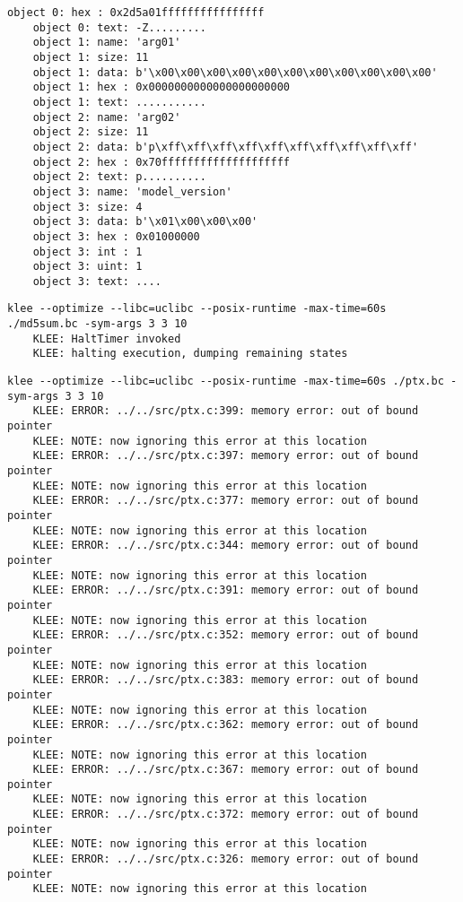 \documentclass[12pt,letterpaper]{article}
\begin{document}
\begin{mdframed}
\begin{lstlisting}[basicstyle=\tiny]
    object 0: hex : 0x2d5a01ffffffffffffffff
    object 0: text: -Z.........
    object 1: name: 'arg01'
    object 1: size: 11
    object 1: data: b'\x00\x00\x00\x00\x00\x00\x00\x00\x00\x00\x00'
    object 1: hex : 0x0000000000000000000000
    object 1: text: ...........
    object 2: name: 'arg02'
    object 2: size: 11
    object 2: data: b'p\xff\xff\xff\xff\xff\xff\xff\xff\xff\xff'
    object 2: hex : 0x70ffffffffffffffffffff
    object 2: text: p..........
    object 3: name: 'model_version'
    object 3: size: 4
    object 3: data: b'\x01\x00\x00\x00'
    object 3: hex : 0x01000000
    object 3: int : 1
    object 3: uint: 1
    object 3: text: ....
  \end{lstlisting}
  \begin{lstlisting}[basicstyle=\tiny]
    klee --optimize --libc=uclibc --posix-runtime -max-time=60s ./md5sum.bc -sym-args 3 3 10
    KLEE: HaltTimer invoked
    KLEE: halting execution, dumping remaining states
  \end{lstlisting}
  \begin{lstlisting}[basicstyle=\tiny]
    klee --optimize --libc=uclibc --posix-runtime -max-time=60s ./ptx.bc -sym-args 3 3 10
    KLEE: ERROR: ../../src/ptx.c:399: memory error: out of bound pointer
    KLEE: NOTE: now ignoring this error at this location
    KLEE: ERROR: ../../src/ptx.c:397: memory error: out of bound pointer
    KLEE: NOTE: now ignoring this error at this location
    KLEE: ERROR: ../../src/ptx.c:377: memory error: out of bound pointer
    KLEE: NOTE: now ignoring this error at this location
    KLEE: ERROR: ../../src/ptx.c:344: memory error: out of bound pointer
    KLEE: NOTE: now ignoring this error at this location
    KLEE: ERROR: ../../src/ptx.c:391: memory error: out of bound pointer
    KLEE: NOTE: now ignoring this error at this location
    KLEE: ERROR: ../../src/ptx.c:352: memory error: out of bound pointer
    KLEE: NOTE: now ignoring this error at this location
    KLEE: ERROR: ../../src/ptx.c:383: memory error: out of bound pointer
    KLEE: NOTE: now ignoring this error at this location
    KLEE: ERROR: ../../src/ptx.c:362: memory error: out of bound pointer
    KLEE: NOTE: now ignoring this error at this location
    KLEE: ERROR: ../../src/ptx.c:367: memory error: out of bound pointer
    KLEE: NOTE: now ignoring this error at this location
    KLEE: ERROR: ../../src/ptx.c:372: memory error: out of bound pointer
    KLEE: NOTE: now ignoring this error at this location
    KLEE: ERROR: ../../src/ptx.c:326: memory error: out of bound pointer
    KLEE: NOTE: now ignoring this error at this location

\end{lstlisting}
\end{mdframed}
\end{document}
